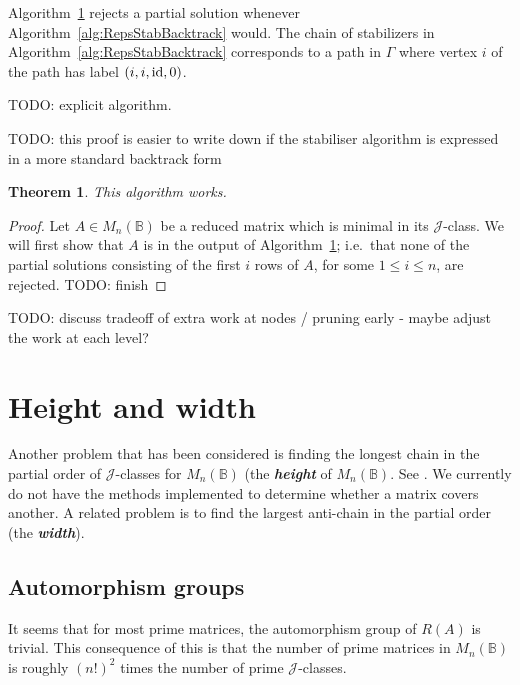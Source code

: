 \documentclass[11pt]{article}
\newtheorem{thm}{Theorem}[section]
\newcommand{\defn}[1]{\textbf{\textit{#1}}}
\numberwithin{equation}{section}
\newcommand{\id}{\mbox{\rm id}}
\newcommand{\B}{\mathbb{B}}
\newcommand{\Bn}{M_n(\B)}
\newcommand{\J}{\mathscr{J}}
\begin{document}
Algorithm~\ref{} rejects a partial solution whenever
Algorithm~\ref{alg:RepsStabBacktrack} would. The chain of stabilizers in
Algorithm~\ref{alg:RepsStabBacktrack} corresponds to a path in $\Gamma$ where
vertex $i$ of the path has label $(i, i, \id, 0)$.

TODO: explicit algorithm.

TODO: this proof is easier to write down if the stabiliser algorithm is
expressed in a more standard backtrack form
\begin{thm}
  This algorithm works.
\end{thm}
\begin{proof}
  Let $A \in \Bn$ be a reduced matrix which is minimal in its $\J$-class. We
  will first show that $A$ is in the output of Algorithm~\ref{}; i.e.\ that none
  of the partial solutions consisting of the first $i$ rows of $A$, for some $1
  \leq i \leq n$, are rejected. TODO: finish 
\end{proof}


TODO: discuss tradeoff of extra work at nodes / pruning early - maybe adjust the
work at each level?


\section{Height and width}
Another problem that has been considered is finding the longest chain in the
partial order of $\J$-classes for $\Bn$ (the \defn{height} of $\Bn$. 
See \cite{Breen2001}. We currently do not have the methods implemented to determine whether a matrix covers another.
A related problem is to find the largest anti-chain in the partial order
(the \defn{width}).




\subsection*{Automorphism groups}
It seems that for most prime matrices, the automorphism group of $R(A)$ is trivial. This consequence of this is that the number of prime matrices in $\Bn$ is roughly $(n!)^2$ times the number of prime $\J$-classes.

\printbibliography
\end{document}
